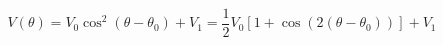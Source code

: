 \begin{equation}
\label{eq:Photodiode_Voltage}
V(\theta) = V_{0} \cos^2(\theta - {\theta}_0)+ V_{1} = \frac{1}{2}V_0\left[1 + \cos(2 (\theta - \theta_0))\right]+ V_1

\end{equation}